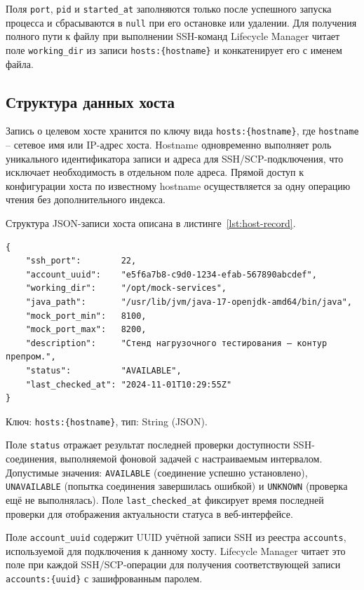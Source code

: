 Поля \texttt{port}, \texttt{pid} и \texttt{started\_at} заполняются только после успешного запуска процесса и сбрасываются в \texttt{null} при его остановке или удалении. Для получения полного пути к файлу при выполнении SSH-команд Lifecycle Manager читает поле \texttt{working\_dir} из записи \texttt{hosts:\{hostname\}} и конкатенирует его с именем файла.

\subsection{Структура данных хоста}

Запись о целевом хосте хранится по ключу вида \texttt{hosts:\{hostname\}}, где \texttt{hostname} -- сетевое имя или IP-адрес хоста. Hostname одновременно выполняет роль уникального идентификатора записи и адреса для SSH/SCP-подключения, что исключает необходимость в отдельном поле адреса. Прямой доступ к конфигурации хоста по известному hostname осуществляется за одну операцию чтения без дополнительного индекса.

Структура JSON-записи хоста описана в листинге~\ref{lst:host-record}.

\begin{listing}[H]
\caption{Структура JSON-записи хоста в Redis}
\label{lst:host-record}
\begin{verbatim}
{
    "ssh_port":        22,
    "account_uuid":    "e5f6a7b8-c9d0-1234-efab-567890abcdef",
    "working_dir":     "/opt/mock-services",
    "java_path":       "/usr/lib/jvm/java-17-openjdk-amd64/bin/java",
    "mock_port_min":   8100,
    "mock_port_max":   8200,
    "description":     "Стенд нагрузочного тестирования – контур препром.",
    "status":          "AVAILABLE",
    "last_checked_at": "2024-11-01T10:29:55Z"
}
\end{verbatim}
\end{listing}

Ключ: \texttt{hosts:\{hostname\}}, тип: String (JSON).

Поле \texttt{status} отражает результат последней проверки доступности SSH-соединения, выполняемой фоновой задачей с настраиваемым интервалом. Допустимые значения: \texttt{AVAILABLE} (соединение успешно установлено), \texttt{UNAVAILABLE} (попытка соединения завершилась ошибкой) и \texttt{UNKNOWN} (проверка ещё не выполнялась). Поле \texttt{last\_checked\_at} фиксирует время последней проверки для отображения актуальности статуса в веб-интерфейсе.

Поле \texttt{account\_uuid} содержит UUID учётной записи SSH из реестра \texttt{accounts}, используемой для подключения к данному хосту. Lifecycle Manager читает это поле при каждой SSH/SCP-операции для получения соответствующей записи \texttt{accounts:\{uuid\}} с зашифрованным паролем.

